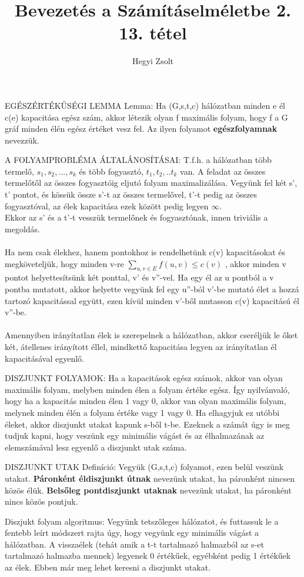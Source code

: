 \documentclass[]{article}
\title{Bevezetés a Számításelméletbe 2.\\{\large 13. tétel}}
\author{Hegyi Zsolt}
\begin{document}
\maketitle
\begin{framed}
EGÉSZÉRTÉKŰSÉGI LEMMA Lemma: Ha (G,s,t,c) hálózatban minden e él c(e) kapacitása egész szám, akkor létezik olyan f maximális folyam, hogy f a G gráf minden élén egész értéket vesz fel. Az ilyen folyamot \textbf{egészfolyamnak} nevezzük.
\end{framed}
\begin{framed}
A FOLYAMPROBLÉMA ÁLTALÁNOSÍTÁSAI: T.f.h. a hálózatban több termelő, $s_1, s_2,...,s_k$ és több fogyasztó, $t_1, t_2,..t_k$ van. A feladat az összes termelőtől az összes fogyasztóig eljutó folyam maximalizálása. Vegyünk fel két s', t' pontot, és kössük össze s'-t az összes termelővel, t'-t pedig az összes fogyasztóval, az élek kapacitása ezek között pedig legyen $\infty$.
\\
Ekkor az s' és a t'-t vesszük termelőnek és fogyasztónak, innen triviális a megoldás.
\\
\\
Ha nem csak élekhez, hanem pontokhoz is rendelhetünk c(v) kapacitásokat és megköveteljük, hogy minden v-re
$\sum_{u,v\in E}^{} f(u,v) \leq c(v)$
, akkor minden v pontot helyettesítsünk két ponttal, v' és v''-vel. Ha egy él az u pontból a v pontba mutatott, akkor helyette vegyünk fel egy u''-ból v'-be mutató élet a hozzá tartozó kapacitással együtt, ezen kívül minden v'-ből mutasson c(v) kapacitású él v''-be.
\\
\\
Amennyiben irányítatlan élek is szerepelnek a hálózatban, akkor cseréljük le őket két, átellenes irányított éllel, mindkettő kapacitása legyen az irányítatlan él kapacitásával egyenlő.
\end{framed}
\begin{framed}
DISZJUNKT FOLYAMOK: Ha a kapacitások egész számok, akkor van olyan maximális folyam, melyben minden élen a folyam értéke egész. Így nyilvánvaló, hogy ha a kapacitás minden élen 1 vagy 0, akkor van olyan maximális folyam, melynek minden élén a folyam értéke vagy 1 vagy 0. Ha elhagyjuk ez utóbbi éleket, akkor diszjunkt utakat kapunk s-ből t-be. Ezeknek a számát úgy is meg tudjuk kapni, hogy veszünk egy minimális vágást és az élhalmazának az elemszámával lesz egyenlő a diszjunkt utak száma.
\end{framed}
\begin{shaded}
DISZJUNKT UTAK Definíció: Vegyük (G,s,t,c) folyamot, ezen belül veszünk utakat. \textbf{Páronként éldiszjunkt útnak} nevezünk utakat, ha páronként nincsen közös élük. \textbf{Belsőleg pontdiszjunkt utaknak} nevezünk utakat, ha páronként nincs közös pontjuk.
\end{shaded}
Diszjukt folyam algoritmus: Vegyünk tetszőleges hálózatot, és futtassuk le a fentebb leírt módszert rajta úgy, hogy vegyünk egy minimális vágást a hálózatban. A visszaélek (tehát amik a t-t tartalmazó halmazból az s-et tartalmazó halmazba mennek) legyenek 0 értékűek, egyébként pedig 1 értékűek az élek. Ebben már meg lehet keresni a diszjunkt utakat.
\end{document}
